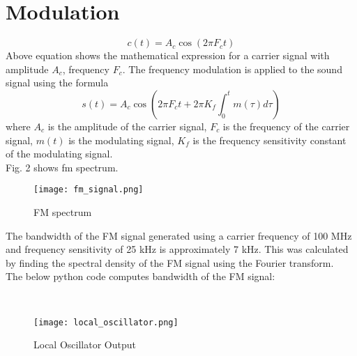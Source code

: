 \documentclass[journal,12pt,twocolumn]{article}
\begin{document}
\section{Modulation}
\begin{equation}
 c(t) = A_c \cos(2 \pi F_c t )
 \label{eq:carrier_signal} 
 \end{equation}
 Above equation shows the mathematical expression for a carrier signal with amplitude $A_c$, frequency $F_c$. 
 \vspace{1cm}
 \newline
The frequency modulation is applied to the sound signal using the formula
 \begin{equation}
 s(t) = A_c \cos \left(2 \pi F_c t +2\pi K_{f} \int_{0}^t m(\tau) d\tau \right) 
 \end{equation}
where $A_c$ is the amplitude of the carrier signal, $F_c$ is the frequency of the carrier signal, $m(t)$ is the modulating signal, $K_{f}$ is the frequency sensitivity constant of the modulating signal.\\
Fig. 2 shows fm spectrum.
\vspace{4cm}
\\
\begin{figure}
\texttt{[image: fm\_signal.png]} 
\label{fig:fm_spectrum}
\caption{FM spectrum}
\end{figure}
The bandwidth of the FM signal generated using a carrier frequency of 100 MHz and frequency sensitivity of 25 kHz is approximately 7 kHz. This was calculated by finding the spectral density of the FM signal using the Fourier transform.\\
The below python code computes bandwidth of the FM signal:
  
    \vspace{0.5cm}
    \vspace{0.5cm}
    \\
\begin{figure}
\texttt{[image: local\_oscillator.png]}
\label{fig:Local_Oscillator} 
\caption{Local Oscillator Output}
\end{figure} 
\end{document}
